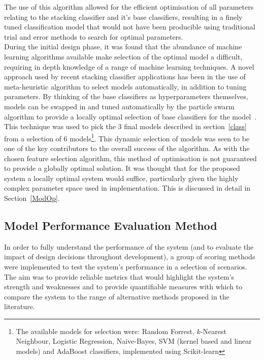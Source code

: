 \documentclass[titlepage, 12pt]{scrartcl} \usepackage{enumitem}
\begin{document}
The use of this algorithm allowed for the efficient optimisation of all
parameters relating to the stacking classifier and it's base classifiers,
resulting in a finely tuned classification model that would not have been
producible using traditional trial and error methods to search for optimal
parameters.\\ During the initial design phase, it was found that the abundance
of machine learning algorithms available make selection of the optimal model a
difficult, requiring in depth knowledge of a range of machine learning
techniques. A novel approach used by recent stacking classifier applications
has been in the use of meta-heuristic algorithm to select models automatically,
in addition to tuning parameters. By thinking of the base classifiers as
hyperparameters themselves, models can be swapped in and tuned automatically by
the particle swarm algorithm to provide a locally optimal selection of base
classifiers for the model~\parencite{Sesmero2015}. This technique was used to
pick the 3 final models described in section~\ref{class} from a selection of 6
models\footnote{The available models for selection were: Random Forrest,
$k$-Nearest Neighbour, Logistic Regression, Naive-Bayes, SVM (kernel based and
linear models) and AdaBoost classifiers, implemented using Scikit-learn}. This
dynamic selection of models was seen to be one of the key contributors to the
overall success of the algorithm. As with the chosen feature selection
algorithm, this method of optimisation is not guaranteed to provide a globally
optimal solution. It was thought that for the proposed system a locally optimal
system would suffice, particularly given the highly complex parameter space
used in implementation. This is discussed in detail in Section~\ref{ModOp}.

\subsection{Model Performance Evaluation Method}\label{metrics}
In order to fully understand the performance of the system (and to evaluate the
impact of design decisions throughout development), a group of scoring methods
were implemented to test the system's performance in a selection of scenarios.
The aim was to provide reliable metrics that would highlight the system's
strength and weaknesses and to provide quantifiable measures with which to
compare the system to the range of alternative methods proposed in the
literature.\\
\end{document}
